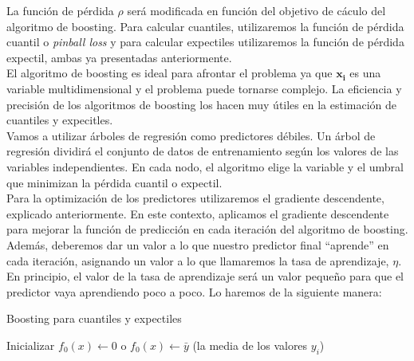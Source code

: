 \documentclass[11pt]{book}
\theoremstyle{plain} %
\theoremstyle{definition} %
\begin{document}
La función de pérdida $\rho$ será modificada en función del objetivo de cáculo 
del algoritmo de boosting. Para calcular cuantiles, utilizaremos la función de pérdida 
cuantil o \textit{pinball loss} y para calcular expectiles utilizaremos la función de pérdida 
expectil, ambas ya presentadas anteriormente.\\

El algoritmo de boosting es ideal para afrontar el problema ya que $\mathbf{x_i}$ es una 
variable multidimensional y el problema puede tornarse complejo. La eficiencia y precisión 
de los algoritmos de boosting los hacen muy útiles en la estimación de cuantiles y 
expecitles.\\

Vamos a utilizar árboles de regresión como predictores débiles. Un árbol de regresión 
dividirá el conjunto de datos de entrenamiento según los valores de las variables
independientes. En cada nodo, el algoritmo elige la variable y el umbral que minimizan 
la pérdida cuantil o expectil.\\

Para la optimización de los predictores utilizaremos el gradiente descendente, explicado 
anteriormente. En este contexto, aplicamos el gradiente descendente para mejorar la 
función de predicción en cada iteración del algoritmo de boosting.\\

Además, deberemos dar un valor a lo que nuestro predictor final ``aprende'' en cada 
iteración, asignando un valor a lo que llamaremos la tasa de aprendizaje, $\eta$. En 
principio, el valor de la tasa de aprendizaje será un valor pequeño para que el predictor 
vaya aprendiendo poco a poco. Lo haremos de la siguiente manera:


\begin{algorithm}[H]
   \caption{Boosting para cuantiles y expectiles}
   
   Inicializar $f_0(x) \gets 0$ o $f_0(x) \gets \bar{y}$ (la media de los valores $y_i$)\;
   
   \end{algorithm}
   
\end{document}
